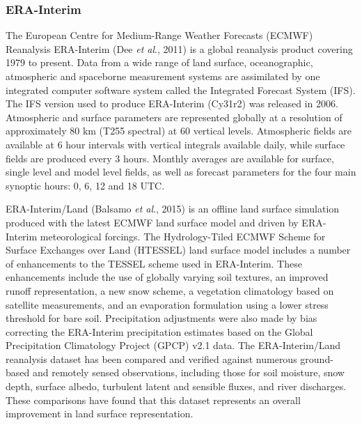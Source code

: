 \documentclass[12pt]{article}
\begin{document}
\subsubsection{ERA-Interim}
The European Centre for Medium-Range Weather Forecasts (ECMWF) Reanalysis ERA-Interim (Dee \textit{et al}., 2011) is a global reanalysis product covering 1979 to present.  Data from a wide range of land surface, oceanographic, atmospheric and spaceborne measurement systems are assimilated by one integrated computer software system called the Integrated Forecast System (IFS).  The IFS version used to produce ERA-Interim (Cy31r2) was released in 2006.  Atmospheric and surface parameters are represented globally at a resolution of approximately 80 km (T255 spectral) at 60 vertical levels.  Atmospheric fields are available at 6 hour intervals with vertical integrals available daily, while surface fields are produced every 3 hours.  Monthly averages are available for surface, single level and model level fields, as well as forecast parameters for the four main synoptic hours:  0, 6, 12 and 18 UTC.

ERA-Interim/Land (Balsamo \textit{et al}., 2015) is an offline land surface simulation produced with the latest ECMWF land surface model and driven by ERA-Interim meteorological forcings.  The Hydrology-Tiled ECMWF Scheme for Surface Exchanges over Land (HTESSEL) land surface model includes a number of enhancements to the TESSEL scheme used in ERA-Interim.  These enhancements include the use of globally varying soil textures, an improved runoff representation, a new snow scheme, a vegetation climatology based on satellite measurements, and an evaporation formulation using a lower stress threshold for bare soil.  Precipitation adjustments were also made by bias correcting the ERA-Interim precipitation estimates based on the Global Precipitation Climatology Project (GPCP) v2.1 data.  The ERA-Interim/Land reanalysis dataset has been compared and verified against numerous ground-based and remotely sensed observations, including those for soil moisture, snow depth, surface albedo, turbulent latent and sensible fluxes, and river discharges.  These comparisons have found that this dataset represents an overall improvement in land surface representation.
\end{document}
